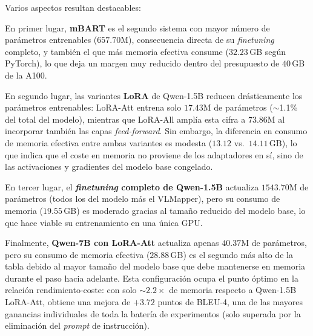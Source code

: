 \begin{table}[H]
    \centering
    \caption{Coste computacional de los distintos sistemas. Parámetros en millones. VRAM Wandb: memoria GPU reservada por el proceso; VRAM PyTorch: pico de memoria efectivamente ocupada por tensores (\texttt{torch.cuda.max\_memory\_allocated}).}
    \label{tab:compute}
\end{table}

Varios aspectos resultan destacables:

En primer lugar, \textbf{mBART} es el segundo sistema con mayor número de parámetros entrenables ($657.70$M), consecuencia directa de su \textit{finetuning} completo, y también el que más memoria efectiva consume ($32.23$\,GB según PyTorch), lo que deja un margen muy reducido dentro del presupuesto de $40$\,GB de la A100.

En segundo lugar, las variantes \textbf{LoRA} de Qwen-1.5B reducen drásticamente los parámetros entrenables: LoRA-Att entrena solo $17.43$M de parámetros ($\sim$1.1\% del total del modelo), mientras que LoRA-All amplía esta cifra a $73.86$M al incorporar también las capas \textit{feed-forward}.
Sin embargo, la diferencia en consumo de memoria efectiva entre ambas variantes es modesta ($13.12$ vs.\ $14.11$\,GB), lo que indica que el coste en memoria no proviene de los adaptadores en sí, sino de las activaciones y gradientes del modelo base congelado.

En tercer lugar, el \textbf{\textit{finetuning} completo de Qwen-1.5B} actualiza $1543.70$M de parámetros (todos los del modelo más el VLMapper), pero su consumo de memoria ($19.55$\,GB) es moderado gracias al tamaño reducido del modelo base, lo que hace viable su entrenamiento en una única GPU.

Finalmente, \textbf{Qwen-7B con LoRA-Att} actualiza apenas $40.37$M de parámetros, pero su consumo de memoria efectiva ($28.88$\,GB) es el segundo más alto de la tabla debido al mayor tamaño del modelo base que debe mantenerse en memoria durante el paso hacia adelante.
Esta configuración ocupa el punto óptimo en la relación rendimiento-coste: con solo $\sim$$2.2\times$ de memoria respecto a Qwen-1.5B LoRA-Att, obtiene una mejora de $+3.72$ puntos de BLEU-4, una de las mayores ganancias individuales de toda la batería de experimentos (solo superada por la eliminación del \textit{prompt} de instrucción).
